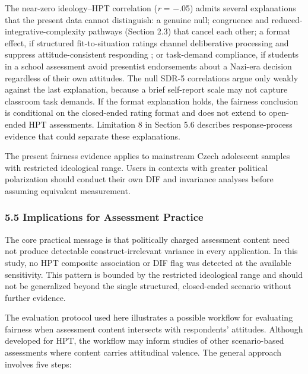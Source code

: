 \documentclass[
  12pt,
]{article}
\newcommand{\Loc}[1]{\linelabel{loc:#1}}
\newcommand{\LocEnd}[1]{\linelabel{loc:#1:end}}
\begin{document}
\Loc{s54-pathways}The near-zero ideology--HPT correlation (\emph{r} = $-$.05) admits several
explanations that the present data cannot distinguish: a genuine null;
congruence and reduced-integrative-complexity pathways (Section 2.3) that
cancel each other; a format effect, if structured fit-to-situation ratings
channel deliberative processing and suppress attitude-consistent responding
\citep{Evans2013}; or task-demand compliance, if students in a school
assessment avoid presentist endorsements about a Nazi-era decision regardless
of their own attitudes. The null SDR-5 correlations argue only weakly against
the last explanation, because a brief self-report scale may not capture
classroom task demands. If the format explanation holds, the fairness
conclusion is conditional on the closed-ended rating format and does not
extend to open-ended HPT assessments. Limitation 8 in Section 5.6 describes
response-process evidence that could separate these explanations.\LocEnd{s54-pathways}

The present fairness evidence applies to mainstream Czech adolescent
samples with restricted ideological range. Users in contexts with
greater political polarization should conduct their own DIF and
invariance analyses before assuming equivalent measurement.

\hypertarget{implications-for-assessment-practice}{%
\subsubsection{5.5 Implications for Assessment Practice}\label{implications-for-assessment-practice}}

The core practical message is that politically charged assessment content need
not produce detectable construct-irrelevant variance in every application. In
this study, no HPT composite association or DIF flag was detected at the
available sensitivity. This pattern is bounded by the restricted ideological
range and should not be generalized beyond the single structured,
closed-ended scenario without further evidence.

The evaluation protocol used here illustrates a possible workflow for
evaluating fairness when assessment content intersects with respondents'
attitudes. Although developed for HPT, the workflow may inform studies of
other scenario-based assessments where content carries attitudinal valence.
The general approach involves five steps:
\end{document}
